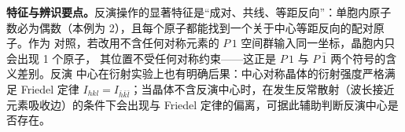 \textbf{特征与辨识要点。}反演操作的显著特征是``成对、共线、等距反向''：单胞内原子
数必为偶数（本例为 2），且每个原子都能找到一个关于中心等距反向的配对原子。作为
对照，若改用不含任何对称元素的 $P\,1$ 空间群输入同一坐标，晶胞内只会出现 1 个原子，
其位置不受任何对称约束——这正是 $P\,1$ 与 $P\,\bar1$ 两个符号的含义差别。反演
中心在衍射实验上也有明确后果：中心对称晶体的衍射强度严格满足 Friedel 定律
$I_{hkl}=I_{\bar h\bar k\bar l}$；当晶体不含反演中心时，在发生反常散射（波长接近
元素吸收边）的条件下会出现与 Friedel 定律的偏离，可据此辅助判断反演中心是否存在。
